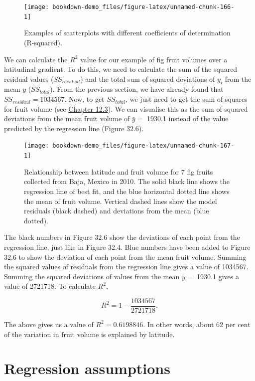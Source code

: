 \documentclass[
]{scrbook}
\begin{document}
\begin{figure}
\texttt{[image: bookdown-demo\_files/figure-latex/unnamed-chunk-166-1]} \caption{Examples of scatterplots with different coefficients of determination (R-squared).}\label{fig:unnamed-chunk-166}
\end{figure}

We can calculate the \(R^{2}\) value for our example of fig fruit volumes over a latitudinal gradient.
To do this, we need to calculate the sum of the squared residual values (\(SS_{residual}\)) and the total sum of squared deviations of \(y_{i}\) from the mean \(\bar{y}\) (\(SS_{total}\)).
From the previous section, we have already found that \(SS_{residaul} = 1034567\).
Now, to get \(SS_{total}\), we just need to get the sum of squares for fruit volume (see \protect\hyperlink{the-variance}{Chapter 12.3}).
We can visualise this as the sum of squared deviations from the mean fruit volume of \(\bar{y} =\) 1930.1 instead of the value predicted by the regression line (Figure 32.6).

\begin{figure}
\texttt{[image: bookdown-demo\_files/figure-latex/unnamed-chunk-167-1]} \caption{Relationship between latitude and fruit volume for 7 fig fruits collected from Baja, Mexico in 2010. The solid black line shows the regression line of best fit, and the blue horizontal dotted line shows the mean of fruit volume. Vertical dashed lines show the model residuals (black dashed) and deviations from the mean (blue dotted).}\label{fig:unnamed-chunk-167}
\end{figure}

The black numbers in Figure 32.6 show the deviations of each point from the regression line, just like in Figure 32.4.
Blue numbers have been added to Figure 32.6 to show the deviation of each point from the mean fruit volume.
Summing the squared values of residuals from the regression line gives a value of 1034567.
Summing the squared deviations of values from the mean \(\bar{y} =\) 1930.1 gives a value of 2721718.
To calculate \(R^{2}\),

\[R^{2} = 1 - \frac{1034567}{2721718}.\]

The above gives us a value of \(R^{2} = 0.6198846\).
In other words, about 62 per cent of the variation in fruit volume is explained by latitude.

\hypertarget{regression-assumptions}{%
\section{Regression assumptions}\label{regression-assumptions}}
\end{document}

